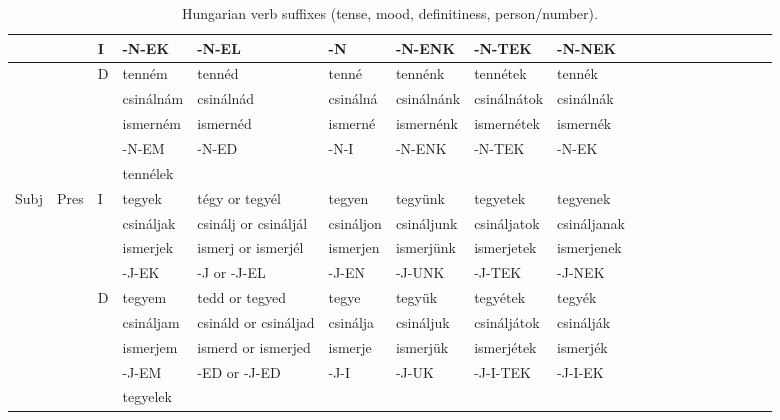 \documentclass[11pt,letterpaper]{article}
\begin{document}
\begin{table}[]
{\begin{tabular}{lll||llllllllllllllll}
  & &   I    &-N-EK &	-N-EL &	-N &	-N-ENK &	-N-TEK &	-N-NEK \\\hline
   &&  D    &tenném &	tennéd &	tenné &	tennénk &	tennétek &	tennék \\
   &&       & csinálnám &	csinálnád &	csinálná &	csinálnánk &	csinálnátok &	csinálnák \\
 &&&  ismerném &	ismernéd &	ismerné &	ismernénk 	&ismernétek &	ismernék \\
&&      &-N-EM &	-N-ED &	-N-I &	-N-ENK &	-N-TEK &	-N-EK \\ \hline
       &&  &tennélek \\ \hline
Subj & Pres & I         &tegyek &	tégy or tegyél &	tegyen &	tegyünk &	tegyetek &	tegyenek \\
     &      &           & csináljak &	csinálj or
csináljál &	csináljon &	csináljunk& 	csináljatok &	csináljanak \\
&&&ismerjek &	ismerj or
ismerjél &	ismerjen &	ismerjünk &	ismerjetek &	ismerjenek \\
 &  &          &-J-EK &	-J or -J-EL &	-J-EN &	-J-UNK &	-J-TEK &	-J-NEK \\ \hline
&&D         &tegyem &	tedd or tegyed &	tegye &	tegyük& 	tegyétek &	tegyék \\
&&          & csináljam &	csináld or
csináljad &	csinálja &	csináljuk &	csináljátok &	csinálják \\
&&&ismerjem &	ismerd or
ismerjed &	ismerje &	ismerjük &	ismerjétek & ismerjék
 \\
&&         &-J-EM &	-ED or -J-ED &	-J-I &	-J-UK & 	-J-I-TEK &	-J-I-EK \\ \hline
  &&       &tegyelek \\
    \end{tabular}
    }
    \caption{Hungarian verb suffixes (tense, mood, definitiness, person/number).}
    \label{tab:my_label}
\end{table}
\end{document}
